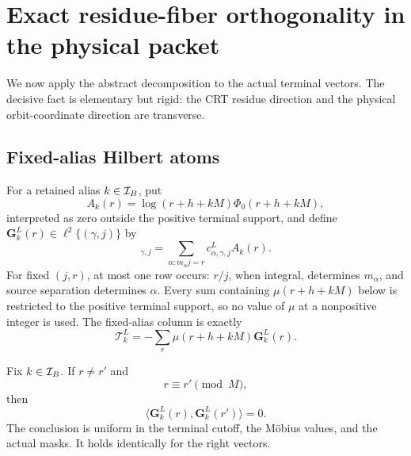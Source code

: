 \section{Exact residue-fiber orthogonality in the physical packet}
\label{sec:tpc42-residue-orthogonality}

We now apply the abstract decomposition to the actual terminal vectors.
The decisive fact is elementary but rigid: the CRT residue direction and
the physical orbit-coordinate direction are transverse.

\subsection{Fixed-alias Hilbert atoms}

For a retained alias \(k\in\mathcal I_B\), put
\begin{equation}
 A_k(r)=\log(r+h+kM)\Phi_0(r+h+kM),
 \label{eq:tpc42-Akr}
\end{equation}
interpreted as zero outside the positive terminal support, and define
\(\mathbf G_k^L(r)\in\ell^2\{(\gamma,j)\}\) by
\begin{equation}
 [\mathbf G_k^L(r)]_{\gamma,j}
 =\sum_{\alpha:m_\alpha j=r}
   c^L_{\alpha,\gamma,j}A_k(r).
 \label{eq:tpc42-fixed-k-G}
\end{equation}
For fixed \((j,r)\), at most one row occurs: \(r/j\), when integral,
determines \(m_\alpha\), and source separation determines \(\alpha\).
Every sum containing \(\mu(r+h+kM)\) below is restricted to the positive
terminal support, so no value of \(\mu\) at a nonpositive integer is used.
The fixed-alias column is exactly
\begin{equation}
 \mathscr T_k^L
 =-\sum_r\mu(r+h+kM)\mathbf G_k^L(r).
 \label{eq:tpc42-fixed-k-compression}
\end{equation}

\begin{theorem}
\label{thm:tpc42-fixed-alias-orthogonality}
Fix \(k\in\mathcal I_B\).  If \(r\ne r'\) and
\begin{equation}
 r\equiv r'\pmod M,
 \label{eq:tpc42-same-base-residue}
\end{equation}
then
\begin{equation}
 \boxed{
 \langle\mathbf G_k^L(r),\mathbf G_k^L(r')\rangle=0.}
 \label{eq:tpc42-G-orthogonal}
\end{equation}
The conclusion is uniform in the terminal cutoff, the M\"obius values,
and the actual masks.  It holds identically for the right vectors.
\end{theorem}

